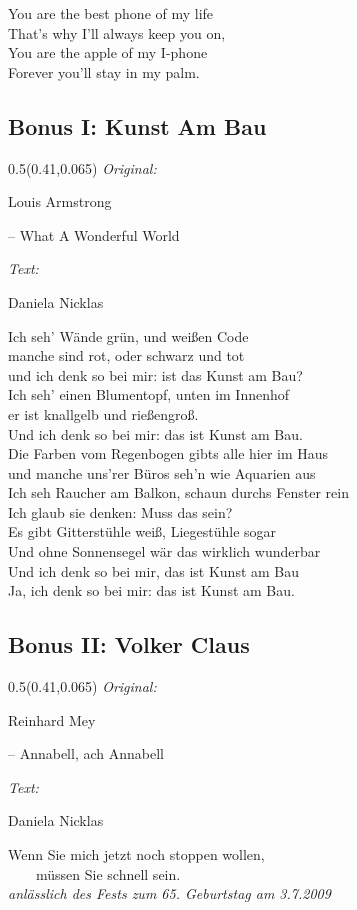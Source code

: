 \documentclass[11pt,a5paper]{article}
\newcommand\songinfo[2]{\begin{textblock}{0.5}(0.41,0.065)
		\footnotesize
		\hfill \textit{Original:} \ \ \ \ \ \ \ \ \ \ \ \ \ \ \ \ \ \ \ \ 
		
		\hfill #1
		
		\hfill  \textit{Text:} \ \ \ \ \ \ \ \ \ \ \ \ \ \ \ \ \ \ \ \ 
		
		\hfill #2
	\end{textblock}}
\begin{document}
			You are the best phone of my life \\
			That's why I'll always keep you on, \\
			You are the apple of my I-phone \\
			Forever you'll stay in my palm. \\
			\pagebreak
			\subsection{Bonus I: Kunst Am Bau}
			\songinfo{Louis Armstrong 
				
				\hfill -- What A Wonderful World}{Daniela Nicklas}
			Ich seh' Wände grün, und weißen Code \\
			manche sind rot, oder schwarz und tot \\
			und ich denk so bei mir: ist das Kunst am Bau? \\
			
			Ich seh' einen Blumentopf, unten im Innenhof \\
			er ist knallgelb und rießengroß. \\
			Und ich denk so bei mir: das ist Kunst am Bau. \\
			
			Die Farben vom Regenbogen gibts alle hier im Haus \\
			und manche uns'rer Büros seh'n wie Aquarien aus \\
			Ich seh Raucher am Balkon, schaun durchs Fenster rein \\
			Ich glaub sie denken: \glqq Muss das sein?\grqq \\
			
			Es gibt Gitterstühle weiß, Liegestühle sogar \\
			Und ohne Sonnensegel wär das wirklich wunderbar \\
			Und ich denk so bei mir, das ist Kunst am Bau \\
			Ja, ich denk so bei mir: das ist Kunst am Bau. \\
			\pagebreak
			\subsection{Bonus II: Volker Claus}
			\songinfo{Reinhard Mey 
				
				\hfill -- Annabell, ach Annabell}{Daniela Nicklas}
			
			\glqq Wenn Sie mich jetzt noch stoppen wollen, \\ \ \ \ \ müssen Sie schnell sein.\grqq \\
			\textit{anlässlich des Fests zum 65. Geburtstag am 3.7.2009} \\
			
\end{document}
